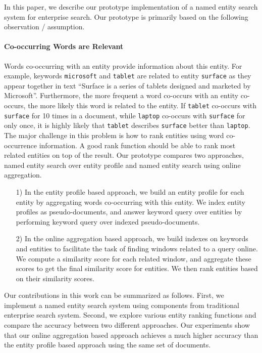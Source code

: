 \documentclass{sig-alternate}
\theoremstyle{definition}
\begin{document}
In this paper, we describe our prototype implementation of a named entity search system for enterprise search. Our prototype is primarily based on the following observation / assumption.

\paragraph*{Co-occurring Words are Relevant} Words co-occurring with an entity provide information about this entity. For example, keywords {\tt microsoft} and {\tt tablet} are related to entity {\tt surface} as they appear together in text ``Surface is a series of tablets designed and marketed by Microsoft''. Furthermore, the more frequent a word co-occurs with an entity co-occurs, the more likely this word is related to the entity. If {\tt tablet} co-occurs with {\tt surface} for 10 times in a document, while {\tt laptop} co-occurs with {\tt surface} for only once, it is highly likely that {\tt tablet} describes {\tt surface} better than {\tt laptop}.
\vskip 2mm
The major challenge in this problem is how to rank entities using word co-occurrence information. A good rank function should be able to rank most related entities on top of the result. Our prototype compares two approaches, named entity search over entity profile and named entity search using online aggregation.
\begin{itemize}
\item[1)] In the entity profile based approach, we build an entity profile for each entity by aggregating words co-occurring with this entity. We index entity profiles as pseudo-documents, and answer keyword query over entities by performing keyword query over indexed pseudo-documents.
\item[2)] In the online aggregation based approach, we build indexes on keywords and entities to facilitate the task of finding windows related to a query online. We compute a similarity score for each related window, and aggregate these scores to get the final similarity score for entities. We then rank entities based on their similarity scores.
\end{itemize}

Our contributions in this work can be summarized as follows. First, we implement a named entity search system using components from traditional enterprise search system. Second, we explore various entity ranking functions and compare the accuracy between two different approaches. Our experiments show that our online aggregation based approach achieves a much higher accuracy than the entity profile based approach using the same set of documents.
\end{document}
